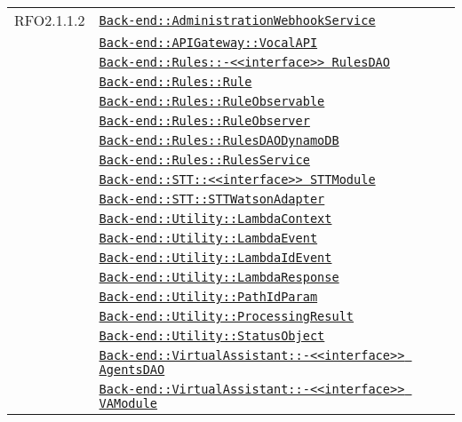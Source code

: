 \begin{longtable}{|>{\centering}m{3cm}|m{10cm}<{\centering}|}
RFO2.1.1.2 & \hyperref[Back-end::AdministrationWebhookService]{\texttt{Back-end::AdministrationWebhookService}}\\
& \hyperref[Back-end::APIGateway::VocalAPI]{\texttt{Back-end::APIGateway::VocalAPI}}\\
& \hyperref[Back-end::Rules::<<interface>> RulesDAO]{\texttt{Back-end::Rules::-\linebreak <<interface>> RulesDAO}}\\
& \hyperref[Back-end::Rules::Rule]{\texttt{Back-end::Rules::Rule}}\\
& \hyperref[Back-end::Rules::RuleObservable]{\texttt{Back-end::Rules::RuleObservable}}\\
& \hyperref[Back-end::Rules::RuleObserver]{\texttt{Back-end::Rules::RuleObserver}}\\
& \hyperref[Back-end::Rules::RulesDAODynamoDB]{\texttt{Back-end::Rules::RulesDAODynamoDB}}\\
& \hyperref[Back-end::Rules::RulesService]{\texttt{Back-end::Rules::RulesService}}\\
& \hyperref[Back-end::STT::<<interface>> STTModule]{\texttt{Back-end::STT::<<interface>> STTModule}}\\
& \hyperref[Back-end::STT::STTWatsonAdapter]{\texttt{Back-end::STT::STTWatsonAdapter}}\\
& \hyperref[Back-end::Utility::LambdaContext]{\texttt{Back-end::Utility::LambdaContext}}\\
& \hyperref[Back-end::Utility::LambdaEvent]{\texttt{Back-end::Utility::LambdaEvent}}\\
& \hyperref[Back-end::Utility::LambdaIdEvent]{\texttt{Back-end::Utility::LambdaIdEvent}}\\
& \hyperref[Back-end::Utility::LambdaResponse]{\texttt{Back-end::Utility::LambdaResponse}}\\
& \hyperref[Back-end::Utility::PathIdParam]{\texttt{Back-end::Utility::PathIdParam}}\\
& \hyperref[Back-end::Utility::ProcessingResult]{\texttt{Back-end::Utility::ProcessingResult}}\\
& \hyperref[Back-end::Utility::StatusObject]{\texttt{Back-end::Utility::StatusObject}}\\
& \hyperref[Back-end::VirtualAssistant::<<interface>> AgentsDAO]{\texttt{Back-end::VirtualAssistant::-\linebreak <<interface>> AgentsDAO}}\\
& \hyperref[Back-end::VirtualAssistant::<<interface>> VAModule]{\texttt{Back-end::VirtualAssistant::-\linebreak <<interface>> VAModule}}\\

\end{longtable}
